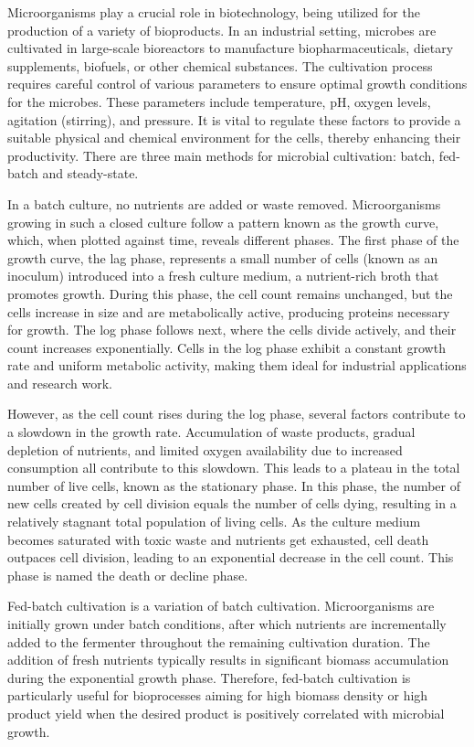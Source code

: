 Microorganisms play a crucial role in biotechnology, being utilized for the production of a variety of bioproducts. In an industrial setting, microbes are cultivated in large-scale bioreactors to manufacture biopharmaceuticals, dietary supplements, biofuels, or other chemical substances. The cultivation process requires careful control of various parameters to ensure optimal growth conditions for the microbes. These parameters include temperature, pH, oxygen levels, agitation (stirring), and pressure. It is vital to regulate these factors to provide a suitable physical and chemical environment for the cells, thereby enhancing their productivity. There are three main methods for microbial cultivation: batch, fed-batch and steady-state. \cite{YangSha2019}

In a batch culture, no nutrients are added or waste removed. Microorganisms growing in such a closed culture follow a pattern known as the growth curve, which, when plotted against time, reveals different phases. The first phase of the growth curve, the lag phase, represents a small number of cells (known as an inoculum) introduced into a fresh culture medium, a nutrient-rich broth that promotes growth. During this phase, the cell count remains unchanged, but the cells increase in size and are metabolically active, producing proteins necessary for growth. The log phase follows next, where the cells divide actively, and their count increases exponentially. Cells in the log phase exhibit a constant growth rate and uniform metabolic activity, making them ideal for industrial applications and research work. \cite{2024Microbial}

However, as the cell count rises during the log phase, several factors contribute to a slowdown in the growth rate. Accumulation of waste products, gradual depletion of nutrients, and limited oxygen availability due to increased consumption all contribute to this slowdown. This leads to a plateau in the total number of live cells, known as the stationary phase. In this phase, the number of new cells created by cell division equals the number of cells dying, resulting in a relatively stagnant total population of living cells. As the culture medium becomes saturated with toxic waste and nutrients get exhausted, cell death outpaces cell division, leading to an exponential decrease in the cell count. This phase is named the death or decline phase. \cite{2024Microbial}

Fed-batch cultivation is a variation of batch cultivation. Microorganisms are initially grown under batch conditions, after which nutrients are incrementally added to the fermenter throughout the remaining cultivation duration. The addition of fresh nutrients typically results in significant biomass accumulation during the exponential growth phase. Therefore, fed-batch cultivation is particularly useful for bioprocesses aiming for high biomass density or high product yield when the desired product is positively correlated with microbial growth. \cite{YangSha2019}


